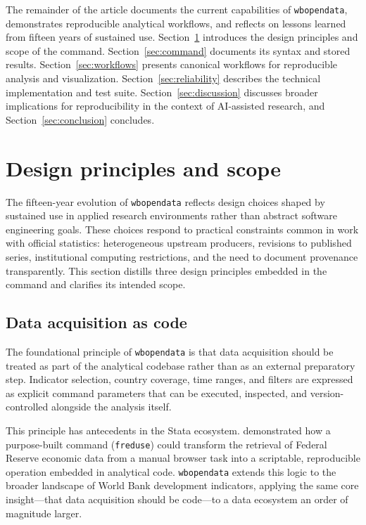 \documentclass[bib]{statapress}
\begin{document}
The remainder of the article documents the current capabilities of \texttt{wbopendata},
demonstrates reproducible analytical workflows, and reflects on lessons learned from fifteen
years of sustained use. Section~\ref{sec:design} introduces the design principles and scope of the command.
Section~\ref{sec:command} documents its syntax and stored results.
Section~\ref{sec:workflows} presents canonical workflows for reproducible analysis and visualization.
Section~\ref{sec:reliability} describes the technical implementation and test suite.
Section~\ref{sec:discussion} discusses broader implications for reproducibility in the context of AI-assisted research,
and Section~\ref{sec:conclusion} concludes.



\section{Design principles and scope}\label{sec:design}
The fifteen-year evolution of \texttt{wbopendata} reflects design choices shaped by
sustained use in applied research environments rather than abstract software
engineering goals. These choices respond to practical constraints common in work
with official statistics: heterogeneous upstream producers, revisions to published
series, institutional computing restrictions, and the need to document provenance
transparently. This section distills three design principles embedded in the command
and clarifies its intended scope.

\subsection{Data acquisition as code}
The foundational principle of \texttt{wbopendata} is that data acquisition should be
treated as part of the analytical codebase rather than as an external preparatory step.
Indicator selection, country coverage, time ranges, and filters are expressed as explicit
command parameters that can be executed, inspected, and version-controlled alongside
the analysis itself.

This principle has antecedents in the Stata ecosystem. \citet{drukker2006freduse}
demonstrated how a purpose-built command (\texttt{freduse}) could transform the
retrieval of Federal Reserve economic data from a manual browser task into a
scriptable, reproducible operation embedded in analytical code. \texttt{wbopendata}
extends this logic to the broader landscape of World Bank development indicators,
applying the same core insight---that data acquisition should be code---to a data
ecosystem an order of magnitude larger.
\end{document}
